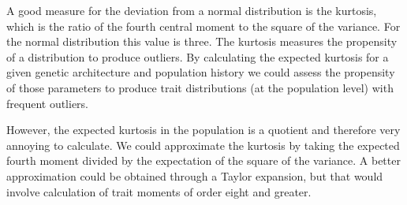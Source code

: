 A good measure for the deviation from a normal distribution is the kurtosis,
which is the ratio of the fourth central moment to the square of the variance.
For the normal distribution this value is three. The kurtosis measures the
propensity of a distribution to produce outliers. By calculating the expected
kurtosis for a given genetic architecture and population history we could assess
the propensity of those parameters to produce trait distributions (at the
population level) with frequent outliers. 

However, the expected kurtosis in the population is a quotient and therefore
very annoying to calculate. We could approximate the kurtosis by taking the
expected fourth moment divided by the expectation of the square of the variance.
A better approximation could be obtained through a Taylor expansion, but that
would involve calculation of trait moments of order eight and greater. 

